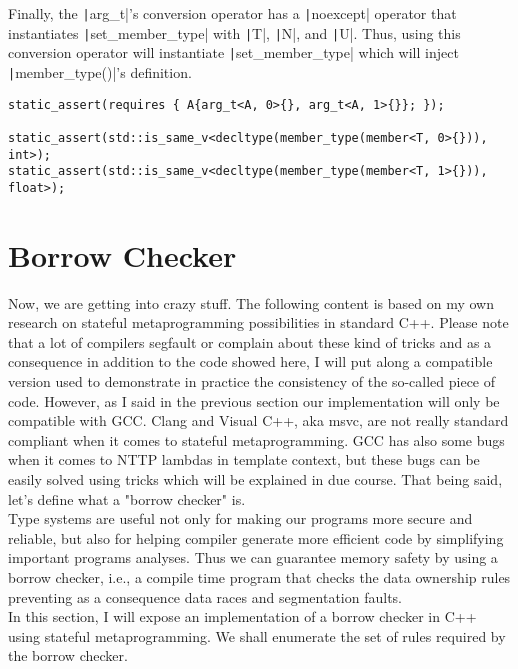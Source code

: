 	Finally, the \texttt|arg_t|'s conversion operator has a \texttt|noexcept| operator that instantiates \texttt|set_member_type| with \texttt|T|, \texttt|N|, and \texttt|U|. Thus, using this conversion operator will instantiate \texttt|set_member_type| which will inject \texttt|member_type()|'s definition.

	\begin{verbatim}
static_assert(requires { A{arg_t<A, 0>{}, arg_t<A, 1>{}}; });

static_assert(std::is_same_v<decltype(member_type(member<T, 0>{})), int>);
static_assert(std::is_same_v<decltype(member_type(member<T, 1>{})), float>);
	\end{verbatim}

    \hrulefill

	\section*{Borrow Checker}

	Now, we are getting into crazy stuff. The following content is based on my own research on stateful metaprogramming possibilities in standard C++. Please note that a lot of compilers segfault or complain about these kind of tricks and as a consequence in addition to the code showed here, I will put along a compatible version used to demonstrate in practice the consistency of the so-called piece of code. However, as I said in the previous section our implementation will only be compatible with GCC. Clang and Visual C++, aka msvc, are not really standard compliant when it comes to stateful metaprogramming. GCC has also some bugs when it comes to NTTP lambdas in template context, but these bugs can be easily solved using tricks which will be explained in due course. That being said, let's define what a "borrow checker" is. \\

	Type systems are useful not only for making our programs more secure and reliable, but also for helping compiler generate more efficient code by simplifying important programs analyses. Thus we can guarantee memory safety by using a borrow checker, i.e., a compile time program that checks the data ownership rules preventing as a consequence data races and segmentation faults.
	\\

	In this section, I will expose an implementation of a borrow checker in C++ using stateful metaprogramming. We shall enumerate the set of rules required by the borrow checker.


